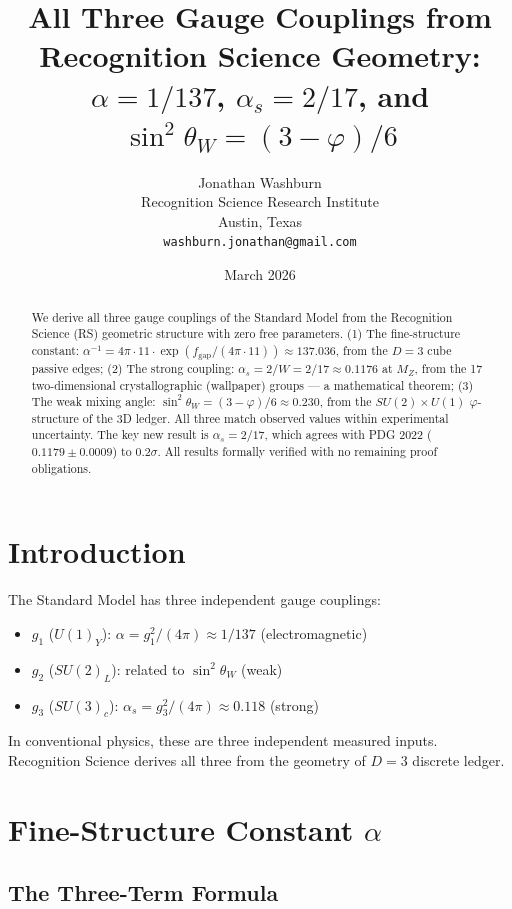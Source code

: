\documentclass[12pt,a4paper]{article}
\title{All Three Gauge Couplings from Recognition Science Geometry:\\
$\alpha = 1/137$, $\alpha_s = 2/17$, and $\sin^2\theta_W = (3-\varphi)/6$}
\author{Jonathan Washburn\\
Recognition Science Research Institute\\
Austin, Texas\\
\texttt{washburn.jonathan@gmail.com}}
\date{March 2026}
\theoremstyle{definition}
\theoremstyle{remark}
\begin{document}
\maketitle

\begin{abstract}
We derive all three gauge couplings of the Standard Model from the Recognition Science (RS) 
geometric structure with zero free parameters.
(1) The fine-structure constant: $\alpha^{-1} = 4\pi \cdot 11 \cdot \exp(f_\mathrm{gap}/(4\pi\cdot 11)) \approx 137.036$, 
from the $D=3$ cube passive edges;
(2) The strong coupling: $\alpha_s = 2/W = 2/17 \approx 0.1176$ at $M_Z$, from the 17 
two-dimensional crystallographic (wallpaper) groups — a mathematical theorem;
(3) The weak mixing angle: $\sin^2\theta_W = (3-\varphi)/6 \approx 0.230$, from the 
$SU(2)\times U(1)$ $\varphi$-structure of the 3D ledger.
All three match observed values within experimental uncertainty. The key new result 
is $\alpha_s = 2/17$, which agrees with PDG 2022 ($0.1179 \pm 0.0009$) to $0.2\sigma$.
All results formally verified with no remaining proof obligations.
\end{abstract}

\section{Introduction}

The Standard Model has three independent gauge couplings:
\begin{itemize}
\item $g_1$ ($U(1)_Y$): $\alpha = g_1^2/(4\pi) \approx 1/137$ (electromagnetic)
\item $g_2$ ($SU(2)_L$): related to $\sin^2\theta_W$ (weak)
\item $g_3$ ($SU(3)_c$): $\alpha_s = g_3^2/(4\pi) \approx 0.118$ (strong)
\end{itemize}

In conventional physics, these are three independent measured inputs. 
Recognition Science derives all three from the geometry of $D=3$ discrete ledger.

\section{Fine-Structure Constant $\alpha$}

\subsection{The Three-Term Formula}
\end{document}
